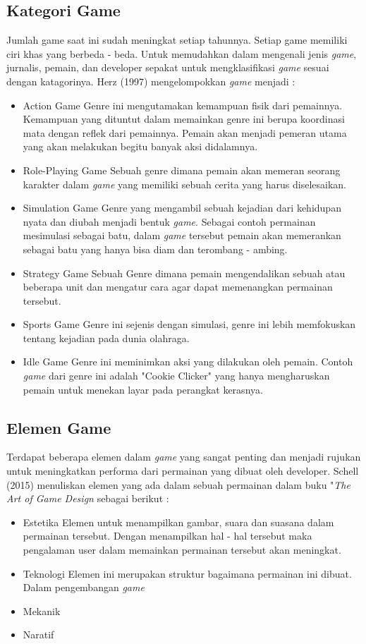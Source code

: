 	\subsection{Kategori Game}
	Jumlah game saat ini sudah meningkat setiap tahunnya. Setiap game memiliki ciri khas yang berbeda - beda. Untuk memudahkan dalam mengenali jenis \textit{game}, jurnalis, pemain, dan developer sepakat untuk mengklasifikasi \textit{game} sesuai dengan katagorinya. Herz (1997) mengelompokkan \textit{game} menjadi :
	\begin{itemize}
		\item Action Game
			\subitem Genre ini mengutamakan kemampuan fisik dari pemainnya. Kemampuan yang dituntut dalam memainkan genre ini berupa koordinasi mata dengan reflek dari pemainnya. Pemain akan menjadi pemeran utama yang akan melakukan begitu banyak aksi didalamnya.
		\item Role-Playing Game
			\subitem Sebuah genre dimana pemain akan memeran seorang karakter dalam \textit{game} yang memiliki sebuah cerita yang harus diselesaikan.
		\item Simulation Game
			\subitem Genre yang mengambil sebuah kejadian dari kehidupan nyata dan diubah menjadi bentuk \textit{game}. Sebagai contoh permainan mesimulasi sebagai batu, dalam \textit{game} tersebut pemain akan memerankan sebagai batu yang hanya bisa diam dan terombang - ambing.
		\item Strategy Game
			\subitem Sebuah Genre dimana pemain mengendalikan sebuah atau beberapa unit dan mengatur cara agar dapat memenangkan permainan tersebut.
		\item Sports Game
			\subitem Genre ini sejenis dengan simulasi, genre ini lebih memfokuskan tentang kejadian pada dunia olahraga.
		\item Idle Game
			\subitem Genre ini meminimkan aksi yang dilakukan oleh pemain. Contoh \textit{game} dari genre ini adalah "Cookie Clicker" yang hanya mengharuskan pemain untuk menekan layar pada perangkat kerasnya.
	\end{itemize}
	
	\subsection{Elemen Game}
	Terdapat beberapa elemen dalam \textit{game} yang sangat penting dan menjadi rujukan untuk meningkatkan performa dari permainan yang dibuat oleh developer. Schell (2015) menuliskan elemen yang ada dalam sebuah permainan dalam buku "\textit{The Art of Game Design} sebagai berikut :
	\begin{itemize}
		\item Estetika
			\subitem Elemen untuk menampilkan gambar, suara dan suasana dalam permainan tersebut. Dengan menampilkan hal - hal tersebut maka pengalaman user dalam memainkan permainan tersebut akan meningkat.
		\item Teknologi
			\subitem Elemen ini merupakan struktur bagaimana permainan ini dibuat. Dalam pengembangan \textit{game} 
		\item Mekanik
		\item Naratif
	\end{itemize}
	
